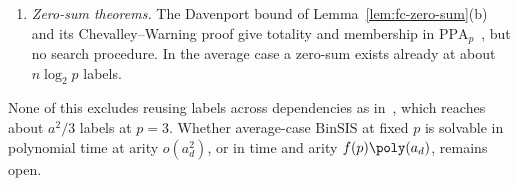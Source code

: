 \begin{remark}
\begin{enumerate}[label=(\roman*),leftmargin=2em]
  \item \emph{Zero-sum theorems.} The Davenport bound of Lemma~\ref{lem:fc-zero-sum}(b) and its Chevalley--Warning proof give totality and membership in $\mathrm{PPA}_p$~\cite{GoosKamathSotirakiZampetakis2020}, but no search procedure. In the average case a zero-sum exists already at about $n\log_2p$ labels.
\end{enumerate}
None of this excludes reusing labels across dependencies as in~\cite{KothariODonnellWu2026}, which reaches about $a^2/3$ labels at $p = 3$. Whether average-case $\mathrm{BinSIS}$ at fixed $p$ is solvable in polynomial time at arity $o(a_d^2)$, or in time and arity $f(p)\poly(a_d)$, remains open.
\end{remark}
